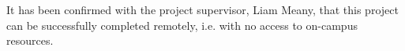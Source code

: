It has been confirmed with the project supervisor, Liam Meany, that this project
can be successfully completed remotely, i.e. with no access to on-campus
resources.
